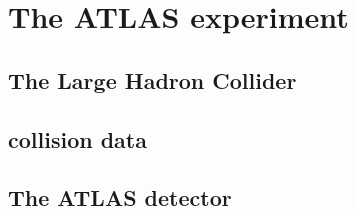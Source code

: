 
\chapter{The ATLAS experiment}
\label{chap:experiment}

\section{The Large Hadron Collider}
	\label{sec:lhc}
	
\section{\pp collision data}
	\label{sec:dataset}
	
\section{The ATLAS detector}
	\label{sec:atlas}
	



